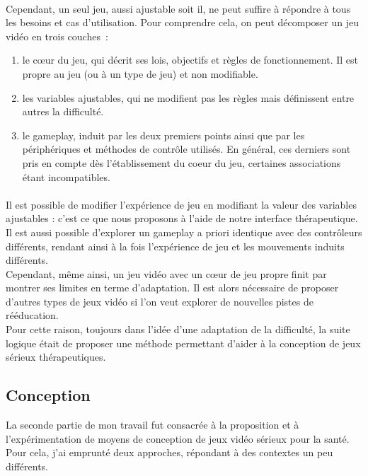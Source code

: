 \paragraph{}
Cependant, un seul jeu, aussi ajustable soit il, ne peut suffire à répondre à tous les besoins et cas d'utilisation. Pour comprendre cela, on peut décomposer un jeu vidéo en trois couches~:
\begin{enumerate}
	\item le cœur du jeu, qui décrit ses lois, objectifs et règles de fonctionnement. Il est propre au jeu (ou à un type de jeu) et non modifiable.
	\item les variables ajustables, qui ne modifient pas les règles mais définissent entre autres la difficulté.
	\item le gameplay, induit par les deux premiers points ainsi que par les périphériques et méthodes de contrôle utilisés. En général, ces derniers sont pris en compte dès l'établissement du coeur du jeu, certaines associations étant incompatibles.
\end{enumerate}
\paragraph{}
Il est possible de modifier l'expérience de jeu en modifiant la valeur des variables ajustables : c'est ce que nous proposons à l'aide de notre interface thérapeutique. Il est aussi possible d'explorer un gameplay a priori identique avec des contrôleurs différents, rendant ainsi à la fois l'expérience de jeu et les mouvements induits différents.
\\Cependant, même ainsi, un jeu vidéo avec un cœur de jeu propre finit par montrer ses limites en terme d'adaptation. Il est alors nécessaire de proposer d'autres types de jeux vidéo si l'on veut explorer de nouvelles pistes de rééducation.\\
Pour cette raison, toujours dans l'idée d'une adaptation de la difficulté, la suite logique était de proposer une méthode permettant d'aider à la conception de jeux sérieux thérapeutiques.
 
\subsection{Conception}
	La seconde partie de mon travail fut consacrée à la proposition et à l'expérimentation de moyens de conception de jeux vidéo sérieux pour la santé. Pour cela, j'ai emprunté deux approches, répondant à des contextes un peu différents.
	
